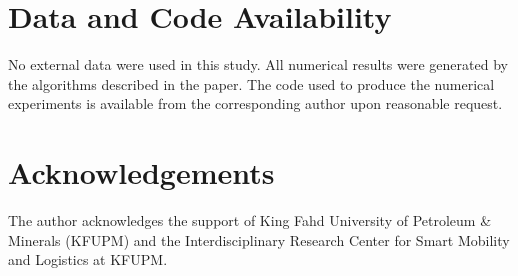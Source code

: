 \documentclass[11pt]{article}
\begin{document}
\section*{Data and Code Availability}
No external data were used in this study. All numerical results were generated by the algorithms described in the paper. The code used to produce the numerical experiments is available from the corresponding author upon reasonable request.

\section*{Acknowledgements}

The author acknowledges the support of King Fahd University of Petroleum \& Minerals (KFUPM) and the Interdisciplinary Research Center for Smart Mobility and Logistics at KFUPM.

\printbibliography
\end{document}
